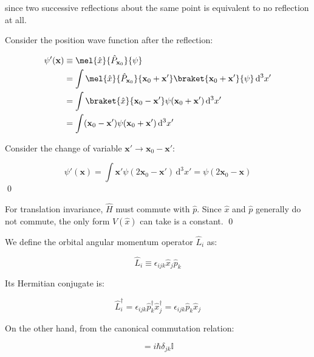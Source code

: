 \documentclass[12pt]{article}
\begin{document}
since two successive reflections about the same point is equivalent to no reflection at all.

Consider the position wave function after the reflection:

\begin{equation}
\begin{split}
    \psi'(\mathbf{x}) &\equiv \mel{\hat{x}}{\hat{P}_{\mathbf{x}_{0}}}{\psi} \\
    &= \int \mel{\hat{x}}{\hat{P}_{\mathbf{x}_{0}}}{\mathbf{x}_{0} + \mathbf{x}'} \braket{\mathbf{x}_{0} + \mathbf{x}'}{\psi} \, \mathrm{d}^{3}x' \\
    &= \int \braket{\hat{x}}{\mathbf{x}_{0} - \mathbf{x}'} \psi(\mathbf{x}_{0} + \mathbf{x}') \, \mathrm{d}^{3}x' \\
    &= \int (\mathbf{x}_{0} - \mathbf{x}') \psi(\mathbf{x}_{0} + \mathbf{x}') \, \mathrm{d}^{3}x' \\
\end{split}
\end{equation}

Consider the change of variable $\mathbf{x}' \to \mathbf{x}_{0} - \mathbf{x}'$:

\begin{equation}
    \psi'(\mathbf{x}) = \int \mathbf{x}' \psi(2\mathbf{x}_{0} - \mathbf{x}') \, \mathrm{d}^{3}x' = \psi(2\mathbf{x}_{0} - \mathbf{x})
\end{equation}
\qed


For translation invariance, $\hat{H}$ must commute with $\hat{p}$. Since $\hat{x}$ and $\hat{p}$ generally do not commute, the only form $V(\hat{x})$ can take is a constant.
\qed


We define the orbital angular momentum operator $\hat{L}_{i}$ as:

\begin{equation}
    \hat{L}_{i} \equiv \epsilon_{ijk} \hat{x}_{j} \hat{p}_{k}
\end{equation}

Its Hermitian conjugate is:

\begin{equation}
    \hat{L}_{i}^{\dagger} = \epsilon_{ijk} \hat{p}_{k}^{\dagger} \hat{x}_{j}^{\dagger} = \epsilon_{ijk} \hat{p}_{k} \hat{x}_{j}
\end{equation}

On the other hand, from the canonical commutation relation:

\begin{equation}
    [\hat{x}_{j}, \hat{p}_{k}] = i\hbar \delta_{jk} \mathbb{I}
\end{equation}
\end{document}
